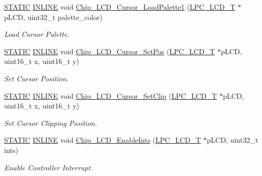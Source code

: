 \begin{DoxyCompactItemize}
\hyperlink{group___l_p_c___types___public___macros_ga10b2d890d871e1489bb02b7e70d9bdfb}{S\+T\+A\+T\+IC} \hyperlink{spifi__18xx__43xx_8h_a2eb6f9e0395b47b8d5e3eeae4fe0c116}{I\+N\+L\+I\+NE} void \hyperlink{group___l_c_d__18_x_x__43_x_x_ga164cb1b18309b45884abfa32b511105e}{Chip\+\_\+\+L\+C\+D\+\_\+\+Cursor\+\_\+\+Load\+Palette1} (\hyperlink{struct_l_p_c___l_c_d___t}{L\+P\+C\+\_\+\+L\+C\+D\+\_\+T} $\ast$p\+L\+CD, uint32\+\_\+t palette\+\_\+color)
\begin{DoxyCompactList}\small\item\em Load Cursor Palette. \end{DoxyCompactList}\item 
\hyperlink{group___l_p_c___types___public___macros_ga10b2d890d871e1489bb02b7e70d9bdfb}{S\+T\+A\+T\+IC} \hyperlink{spifi__18xx__43xx_8h_a2eb6f9e0395b47b8d5e3eeae4fe0c116}{I\+N\+L\+I\+NE} void \hyperlink{group___l_c_d__18_x_x__43_x_x_ga8aeda292a8476655f32568003be7a098}{Chip\+\_\+\+L\+C\+D\+\_\+\+Cursor\+\_\+\+Set\+Pos} (\hyperlink{struct_l_p_c___l_c_d___t}{L\+P\+C\+\_\+\+L\+C\+D\+\_\+T} $\ast$p\+L\+CD, uint16\+\_\+t x, uint16\+\_\+t y)
\begin{DoxyCompactList}\small\item\em Set Cursor Position. \end{DoxyCompactList}\item 
\hyperlink{group___l_p_c___types___public___macros_ga10b2d890d871e1489bb02b7e70d9bdfb}{S\+T\+A\+T\+IC} \hyperlink{spifi__18xx__43xx_8h_a2eb6f9e0395b47b8d5e3eeae4fe0c116}{I\+N\+L\+I\+NE} void \hyperlink{group___l_c_d__18_x_x__43_x_x_ga87c4b7b85b63f40255f2e716321d5879}{Chip\+\_\+\+L\+C\+D\+\_\+\+Cursor\+\_\+\+Set\+Clip} (\hyperlink{struct_l_p_c___l_c_d___t}{L\+P\+C\+\_\+\+L\+C\+D\+\_\+T} $\ast$p\+L\+CD, uint16\+\_\+t x, uint16\+\_\+t y)
\begin{DoxyCompactList}\small\item\em Set Cursor Clipping Position. \end{DoxyCompactList}\item 
\hyperlink{group___l_p_c___types___public___macros_ga10b2d890d871e1489bb02b7e70d9bdfb}{S\+T\+A\+T\+IC} \hyperlink{spifi__18xx__43xx_8h_a2eb6f9e0395b47b8d5e3eeae4fe0c116}{I\+N\+L\+I\+NE} void \hyperlink{group___l_c_d__18_x_x__43_x_x_ga25198b7b084a884217163cbc681ceac4}{Chip\+\_\+\+L\+C\+D\+\_\+\+Enable\+Ints} (\hyperlink{struct_l_p_c___l_c_d___t}{L\+P\+C\+\_\+\+L\+C\+D\+\_\+T} $\ast$p\+L\+CD, uint32\+\_\+t ints)
\begin{DoxyCompactList}\small\item\em Enable Controller Interrupt. \end{DoxyCompactList}\item 

\end{DoxyCompactItemize}
